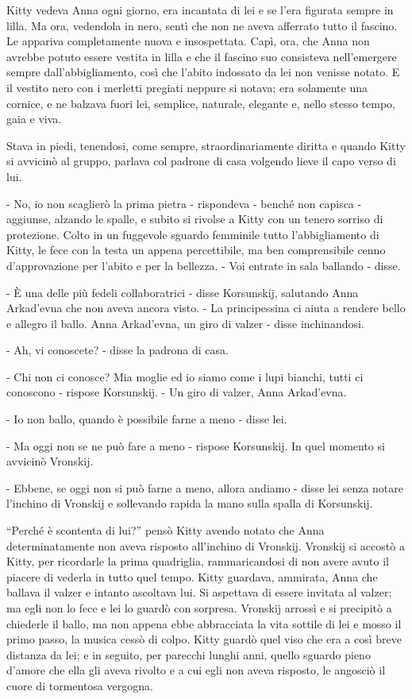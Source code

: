 Kitty vedeva Anna ogni giorno, era incantata di lei e se l'era figurata sempre in lilla. Ma ora, vedendola in nero, sentì che non ne aveva afferrato tutto il fascino. Le appariva completamente nuova e insospettata. Capì, ora, che Anna non avrebbe potuto essere vestita in lilla e che il fascino suo consisteva nell'emergere sempre dall'abbigliamento, così che l'abito indossato da lei non venisse notato. E il vestito nero con i merletti pregiati neppure si notava; era solamente una cornice, e ne balzava fuori lei, semplice, naturale, elegante e, nello stesso tempo, gaia e viva. 

Stava in piedi, tenendosi, come sempre, straordinariamente diritta e quando Kitty si avvicinò al gruppo, parlava col padrone di casa volgendo lieve il capo verso di lui. 

- No, io non scaglierò la prima pietra - rispondeva - benché non capisca - aggiunse, alzando le spalle, e subito si rivolse a Kitty con un tenero sorriso di protezione. Colto in un fuggevole sguardo femminile tutto l'abbigliamento di Kitty, le fece con la testa un appena percettibile, ma ben comprensibile cenno d'approvazione per l'abito e per la bellezza. - Voi entrate in sala ballando - disse. 

- È una delle più fedeli collaboratrici - disse Korsunskij, salutando Anna Arkad'evna che non aveva ancora visto. - La principessina ci aiuta a rendere bello e allegro il ballo. Anna Arkad'evna, un giro di valzer - disse inchinandosi. 

- Ah, vi conoscete? - disse la padrona di casa. 

- Chi non ci conosce? Mia moglie ed io siamo come i lupi bianchi, tutti ci conoscono - rispose Korsunskij. - Un giro di valzer, Anna Arkad'evna. 

- Io non ballo, quando è possibile farne a meno - disse lei. 

- Ma oggi non se ne può fare a meno - rispose Korsunskij. In quel momento si avvicinò Vronskij. 

- Ebbene, se oggi non si può farne a meno, allora andiamo - disse lei senza notare l'inchino di Vronskij e sollevando rapida la mano sulla spalla di Korsunskij. 

``Perché è scontenta di lui?'' pensò Kitty avendo notato che Anna determinatamente non aveva risposto all'inchino di Vronskij. Vronskij si accostò a Kitty, per ricordarle la prima quadriglia, rammaricandosi di non avere avuto il piacere di vederla in tutto quel tempo. Kitty guardava, ammirata, Anna che ballava il valzer e intanto ascoltava lui. Si aspettava di essere invitata al valzer; ma egli non lo fece e lei lo guardò con sorpresa. Vronskij arrossì e si precipitò a chiederle il ballo, ma non appena ebbe abbracciata la vita sottile di lei e mosso il primo passo, la musica cessò di colpo. Kitty guardò quel viso che era a così breve distanza da lei; e in seguito, per parecchi lunghi anni, quello sguardo pieno d'amore che ella gli aveva rivolto e a cui egli non aveva risposto, le angosciò il cuore di tormentosa vergogna. 

